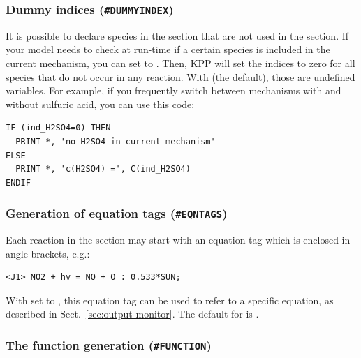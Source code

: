 \documentclass[twoside]{article}
\begin{document}
\subsubsection{Dummy indices ({\tt\#DUMMYINDEX})}
\label{sec:command-dummyindex}

It is possible to declare species in the  section that
are not used in the  section. If your model needs to
check at run-time if a certain species is included in the current
mechanism, you can set  to . Then, KPP will
set the indices  to zero for all species that do not
occur in any reaction. With   (the default),
those  are undefined variables. For example, if you
frequently switch between mechanisms with and without sulfuric acid, you
can use this code:
%
\begin{verbatim}
IF (ind_H2SO4=0) THEN
  PRINT *, 'no H2SO4 in current mechanism'
ELSE
  PRINT *, 'c(H2SO4) =', C(ind_H2SO4)
ENDIF
\end{verbatim}

\subsubsection{Generation of equation tags ({\tt\#EQNTAGS})}
\label{sec:command-eqntags}

Each reaction in the  section may start with an
equation tag which is enclosed in angle brackets, e.g.:
%
\begin{verbatim}
<J1> NO2 + hv = NO + O : 0.533*SUN;
\end{verbatim}
%
With  set to , this equation tag can be used to
refer to a specific equation, as described in
Sect.~\ref{sec:output-monitor}. The default for  is
.

\subsubsection{The function generation ({\tt\#FUNCTION})}
\label{sec:command-function}
\end{document}
